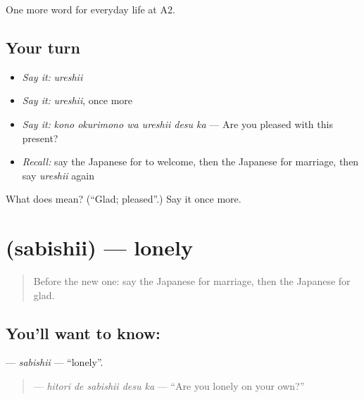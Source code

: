 \begin{grammarlens}[title={What you've built}]
One more word for everyday life at A2.
\end{grammarlens}

\subsection*{Your turn}
\begin{itemize}
\raggedright
  \item \emph{Say it:} \emph{ureshii}
  \item \emph{Say it:} \emph{ureshii}, once more
  \item \emph{Say it:} \emph{kono okurimono wa ureshii desu ka} — Are you pleased with this present?
  \item \emph{Recall:} say the Japanese for to welcome, then the Japanese for marriage, then say \emph{ureshii} again
\end{itemize}

\begin{tcolorbox}[breakable,colback=teal!4,colframe=teal!35!black,title={Before you move on}]
What does  mean? (\textquotedblleft{}Glad; pleased\textquotedblright{}.) Say it once more.
\end{tcolorbox}
\section[\texorpdfstring{\ja{さびしい} (sabishii)}{さびしい (sabishii)}]{ (sabishii) — lonely}

\label{lesson:JA-C245-sabishii}



\begin{quote}
Before the new one: say the Japanese for marriage, then the Japanese for glad.
\end{quote}

\subsection*{You'll want to know: }
\textbf{} — \emph{sabishii} — \textquotedblleft{}lonely\textquotedblright{}.

\begin{quote}
\textbf{ } — \emph{hitori de sabishii desu ka} — \textquotedblleft{}Are you lonely on your own?\textquotedblright{}
\end{quote}

